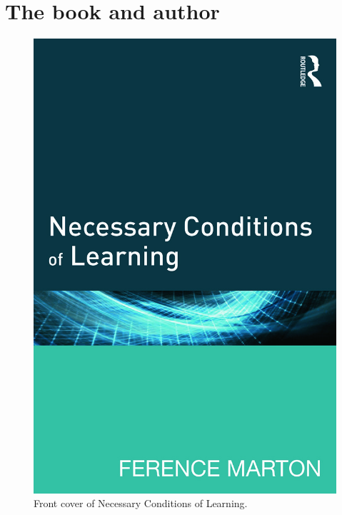 \mode*

\section{The book and author}

\begin{frame}
  \begin{figure}
    \includegraphics[height=0.8\textheight]{fig/book.jpg}
    \caption{Front cover of Necessary Conditions of Learning.}
  \end{figure}
\end{frame}

